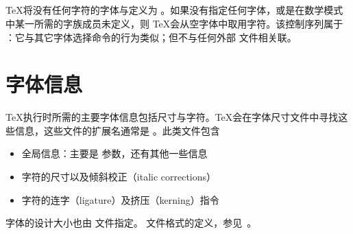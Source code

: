 \documentclass{book}
\begin{document}
\subsection{}

\TeX 将没有任何字符的字体与定义为 。如果没有指定任何字体，或是在数学模式中某一所需的字族成员未定义，则 \TeX 会从空字体中取用字符。该控制序列属于 ：它与其它字体选择命令的行为类似；但不与任何外部  文件相关联。

\section{字体信息}

\TeX 执行时所需的主要字体信息包括尺寸与字符。\TeX 会在字体尺寸文件中寻找这些信息，这些文件的扩展名通常是 。此类文件包含
\begin{itemize}
\item 全局信息：主要是  参数，还有其他一些信息
\item 字符的尺寸以及倾斜校正（italic corrections）
\item 字符的连字（ligature）及挤压（kerning）指令
\end{itemize}
字体的设计大小也由  文件指定。 文件格式的定义，参见~\cite{Knuth:TeXprogram}。
\end{document}
